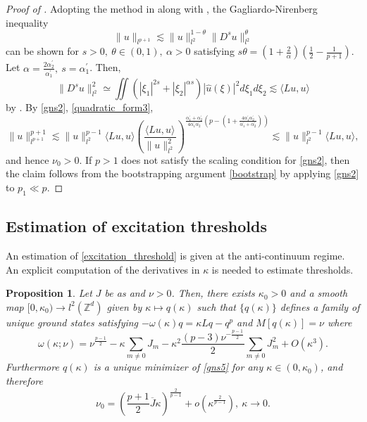 \documentclass{article}
\numberwithin{equation}{section}
\newtheorem{proposition}{Proposition}[section]
\begin{document}
\begin{proof}[Proof of ]
Adopting the method in \cite[Proposition 4]{Younghun} along with , the Gagliardo-Nirenberg inequality
\begin{equation}\label{gns2}
    \| u \|_{l^{p+1}} \lesssim \| u \|_{l^2}^{1-\theta} \| D^s u \|_{l^2}^\theta
\end{equation}
can be shown for $s > 0,\ \theta \in (0,1),\ \alpha > 0$ satisfying $s\theta = (1+\frac{2}{\alpha})(\frac{1}{2} -  \frac{1}{p+1})$. Let $\alpha = \frac{2\alpha_2^\prime}{\alpha_1^\prime},\ s = \alpha_1^\prime$. Then,
\begin{equation}\label{quadratic_form3}
    \| D^s u\|_{l^2}^2 \simeq \iint (|\xi_1|^{2s} + |\xi_2|^{\alpha s}) |\widehat{u}(\xi)|^2 d\xi_1 d\xi_2 \lesssim \langle Lu,u \rangle
\end{equation}
by . By \eqref{gns2}, \eqref{quadratic_form3},
\begin{equation*}
    \| u \|_{l^{p+1}}^{p+1} \lesssim  \| u \|_{l^2}^{p-1} \langle Lu,u \rangle \left(\frac{\langle Lu,u \rangle}{\| u\|_{l^2}^2}\right)^{\frac{\alpha_1^\prime+\alpha_2^\prime}{4\alpha_1^\prime \alpha_2^\prime}\left(p-\left(1 + \frac{4\alpha_1^\prime\alpha_2^\prime}{\alpha_1^\prime + \alpha_2^\prime}\right)\right)} \lesssim \| u \|_{l^2}^{p-1} \langle Lu,u \rangle,
\end{equation*}
and hence $\nu_0 > 0$. If $p > 1$ does not satisfy the scaling condition for \eqref{gns2}, then the claim follows from the bootstrapping argument \eqref{bootstrap} by applying \eqref{gns2} to $p_1 \ll p$. 
\end{proof}

\subsection{Estimation of excitation thresholds}\label{ET2}
An estimation of \eqref{excitation_threshold} is given at the anti-continuum regime. An explicit computation of the derivatives in $\kappa$ is needed to estimate thresholds.

\begin{proposition}\label{onsite}
Let $J$ be as  and $\nu > 0$. Then, there exists $\kappa_0 >0$ and a smooth map $[0,\kappa_0) \rightarrow l^2(\mathbb{Z}^d)$ given by $\kappa \mapsto q(\kappa)$ such that $\{q(\kappa)\}$ defines a family of unique ground states satisfying $-\omega(\kappa) q = \kappa L q - q^p$ and $M[q(\kappa)] = \nu$ where
\begin{equation}\label{omega}
    \omega(\kappa;\nu) = \nu^{\frac{p-1}{2}} -\kappa \sum_{m \neq 0} J_{m} - \kappa^2\frac{(p-3)\nu^{-\frac{p-1}{2}}}{2} \sum_{m \neq 0} J_{m}^2 + O(\kappa^3).
\end{equation}
Furthermore $q(\kappa)$ is a unique minimizer of \eqref{gns5} for any $\kappa \in (0,\kappa_0)$, and therefore
\begin{equation}\label{excitation_threshold2}
    \nu_0 = \left(\frac{p+1}{2} \overline{J} \kappa\right)^{\frac{2}{p-1}} + o(\kappa^{\frac{2}{p-1}}),\ \kappa \rightarrow 0.
\end{equation}
\end{proposition}
\end{document}
